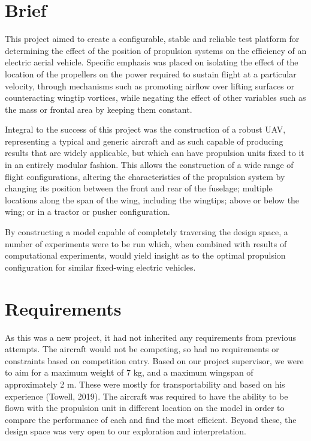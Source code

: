 \documentclass[../../main.tex]{subfiles}
\begin{document}


\section{Brief} \label{sec:design-specification:brief}

This project aimed to create a configurable, stable and reliable test platform for determining the effect of the position of propulsion systems on the efficiency of an electric aerial vehicle.
Specific emphasis was placed on isolating the effect of the location of the propellers on the power required to sustain flight at a particular velocity, through mechanisms such as promoting airflow over lifting surfaces or counteracting wingtip vortices, while negating the effect of other variables such as the mass or frontal area by keeping them constant. 

Integral to the success of this project was the construction of a robust UAV, representing a typical and generic aircraft and as such capable of producing results that are widely applicable, but which can have propulsion units fixed to it in an entirely modular fashion.
This allows the construction of a wide range of flight configurations, altering the characteristics of the propulsion system by changing its position between the front and rear of the fuselage; multiple locations along the span of the wing, including the wingtips; above or below the wing; or in a tractor or pusher configuration. 

By constructing a model capable of completely traversing the design space, a number of experiments were to be run which, when combined with results of computational experiments, would yield insight as to the optimal propulsion configuration for similar fixed-wing electric vehicles. 

\section{Requirements} \label{sec:design-specification:requirements}

As this was a new project, it had not inherited any requirements from previous attempts. 
The aircraft would not be competing, so had no requirements or constraints based on competition entry. 
Based on our project supervisor, we were to aim for a maximum weight of 7 kg, and a maximum wingspan of approximately 2 m.
These were mostly for transportability and based on his experience (Towell, 2019).  %
The aircraft was required to have the ability to be flown with the propulsion unit in different location on the model in order to compare the performance of each and find the most efficient. 
Beyond these, the design space was very open to our exploration and interpretation. 
\end{document}
